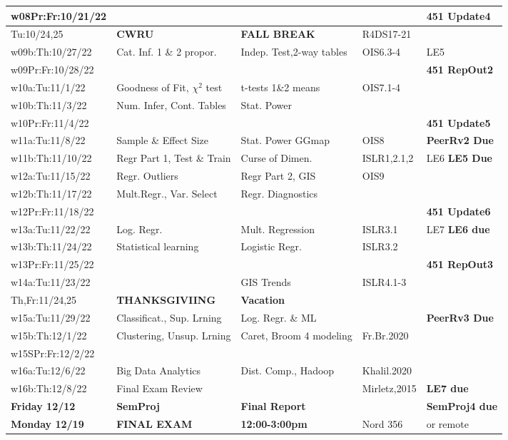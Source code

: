 \documentclass[10pt]{article} %
\begin{document}
\begin{table}[h]
\begin{tabular}{| p{2.9cm} | p{3.9cm} | p{3.9cm} | p{1.8
        cm} | p{2.5cm} |}
		\hline
	w08Pr:Fr:10/21/22 & & & & {\bf 451 Update4} \\
	\hline
	\hline
	Tu:10/24,25 &  {\bf CWRU} & {\bf FALL BREAK} & R4DS17-21 \\
	\hline
	w09b:Th:10/27/22 & Cat. Inf. 1 \& 2 propor. & Indep. Test,2-way tables & OIS6.3-4  & LE5  \\
	\hline
	w09Pr:Fr:10/28/22 &  & & & {\bf 451 RepOut2} \\
	\hline
	\hline
	w10a:Tu:11/1/22 & Goodness of Fit, $\chi^2$ test & t-tests 1\&2 means & OIS7.1-4 &  \\
	\hline
	w10b:Th:11/3/22 & Num. Infer, Cont. Tables & Stat. Power  &  &  \\
	\hline
	w10Pr:Fr:11/4/22 & & & & {\bf 451 Update5} \\
	\hline
	\hline
	w11a:Tu:11/8/22 & Sample \& Effect Size & Stat. Power GGmap  & OIS8 & {\bf PeerRv2 Due} \\
	\hline
	w11b:Th:11/10/22 & Regr Part 1, Test \& Train & Curse of Dimen. & ISLR1,2.1,2 & LE6 {\bf LE5 Due} \\
	\hline
	\hline
	w12a:Tu:11/15/22 & Regr. Outliers & Regr Part 2, GIS & OIS9 &  \\
	\hline
	w12b:Th:11/17/22 & Mult.Regr., Var. Select & Regr. Diagnostics &  \\
	\hline
	w12Pr:Fr:11/18/22 & & & & {\bf 451 Update6} \\
	\hline
	\hline
	w13a:Tu:11/22/22 & Log. Regr. & Mult. Regression & ISLR3.1 & LE7 {\bf LE6 due} \\
	\hline
	w13b:Th:11/24/22 & Statistical learning & Logistic Regr. & ISLR3.2 &  \\
  \hline
  w13Pr:Fr:11/25/22 & & & & {\bf 451 RepOut3} \\
	\hline
	\hline
	w14a:Tu:11/23/22 &  & GIS Trends & ISLR4.1-3 &  \\
  \hline
  Th,Fr:11/24,25 & {\bf THANKSGIVIING} & {\bf Vacation} & \\
	\hline
	\hline
	w15a:Tu:11/29/22 & Classificat., Sup. Lrning & Log. Regr. \& ML & & {\bf PeerRv3 Due}  \\
  \hline
  w15b:Th:12/1/22 & Clustering, Unsup. Lrning & Caret, Broom 4 modeling & Fr.Br.2020 &   \\
	\hline
	w15SPr:Fr:12/2/22 &  &  &   &  \\
	\hline
	\hline
  w16a:Tu:12/6/22 & Big Data Analytics & Dist. Comp., Hadoop & Khalil.2020 &   \\
  \hline
  w16b:Th:12/8/22 & Final Exam Review &  & Mirletz,2015 & {\bf LE7 due}  \\
  \hline
  \hline
  {\bf Friday 12/12} & {\bf SemProj} & {\bf Final Report}  & & {\bf SemProj4 due} \\
	\hline
	{\bf Monday 12/19} & {\bf FINAL EXAM} &  {\bf 12:00-3:00pm} & Nord 356 & or remote  \\
	\hline
	\hline
  \end{tabular}


\end{table}
\end{document}
